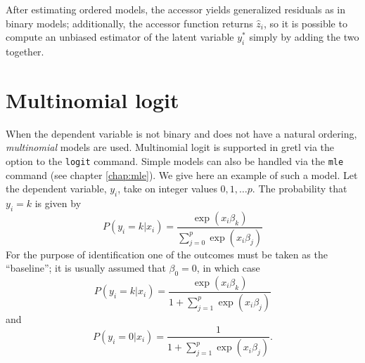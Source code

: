 After estimating ordered models, the  accessor yields
generalized residuals as in binary models; additionally, the
 accessor function returns $\hat{z}_i$, so it is
possible to compute an unbiased estimator of the latent variable
$y^*_i$ simply by adding the two together.

\section{Multinomial logit}
\label{sec:mlogit}

When the dependent variable is not binary and does not have a natural
ordering, \emph{multinomial} models are used.  Multinomial logit is
supported in gretl via the  option to the
\texttt{logit} command.  Simple models can also be handled via the
\texttt{mle} command (see chapter \ref{chap:mle}). We give here an
example of such a model.  Let the dependent variable, $y_i$, take on
integer values $0,1,\dots p$.  The probability that $y_i = k$ is given
by
\[
  P(y_i = k |  x_i) = \frac{\exp(x_i \beta_k)}{\sum_{j=0}^p \exp(x_i \beta_j)}
\]
For the purpose of identification one of the outcomes must be taken as
the ``baseline''; it is usually assumed that $\beta_0 = 0$, in which case
\[
  P(y_i = k |  x_i) = \frac{\exp(x_i \beta_k)}{1 + \sum_{j=1}^p \exp(x_i \beta_j)} 
\]
and
\[
  P(y_i = 0 |  x_i) = \frac{1}{1 + \sum_{j=1}^p \exp(x_i \beta_j)} .
\]

